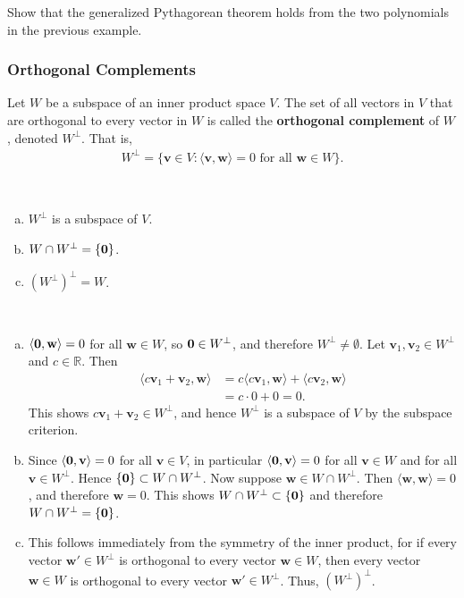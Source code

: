 \documentclass[12pt,letterpaper,reqno]{article}
\numberwithin{equation}{section}
\newcommand{\bv}{\mathbf{v}}
\newcommand{\bw}{\mathbf{w}}
\begin{document}
\begin{exercise}
	Show that the generalized Pythagorean theorem holds from the two polynomials in the previous example.
\end{exercise}

\subsubsection{Orthogonal Complements}
\begin{defn}
Let $W$ be a subspace of an inner product space $V$. The set of all vectors in $V$ that are orthogonal to every vector in $W$ is called the {\bf orthogonal complement} of $W$, denoted $W^\perp$. That is,
\begin{align*}
	W^\perp = \{\bv \in V : \langle \bv,\bw \rangle = 0 \text{ for all } \bw \in W\}.
\end{align*}	
\end{defn}

\begin{thm}\label{thm:orthogonal_complement}\
	\begin{enumerate}[(a)]
		\item $W^\perp$ is a subspace of $V$.
		\item $W \cap W^\perp=\{{\bf 0}\}$.
		\item $(W^\perp)^\perp=W$.
	\end{enumerate}
\end{thm}

\begin{pf}
	\
	\begin{enumerate}[(a)]
		\item $\langle {\bf 0},\bw \rangle = 0$ for all $\bw \in W$, so ${\bf 0} \in W^\perp$, and therefore $W^\perp \neq \emptyset$. Let $\bv_1,\bv_2 \in W^\perp$ and $c \in \mathbb{R}$. Then
		\begin{align*}
			\langle c\bv_1+\bv_2,\bw \rangle &=c\langle c\bv_1,\bw \rangle+\langle c\bv_2,\bw \rangle \\
			&=c \cdot 0 + 0 = 0.
		\end{align*}
		This shows $c\bv_1+\bv_2 \in W^\perp$, and hence $W^\perp$ is a subspace of $V$ by the subspace criterion.
		\item Since $\langle {\bf 0}, \bv \rangle=0$ for all $\bv \in V$, in particular $\langle {\bf 0}, \bv \rangle=0$ for all $\bv \in W$ and for all $\bv \in W^\perp$. Hence $\{{\bf 0}\} \subset W \cap W^\perp$. Now suppose $\bw \in W \cap W^\perp$. Then $\langle \bw,\bw \rangle = 0$, and therefore $\bw=0$. This shows $W \cap W^\perp \subset \{{\bf 0}\}$ and therefore $W \cap W^\perp = \{{\bf 0}\}$.
		\item This follows immediately from the symmetry of the inner product, for if every vector $\bw' \in W^\perp$ is orthogonal to every vector $\bw \in W$, then every vector $\bw \in W$ is orthogonal to every vector $\bw' \in W^\perp$. Thus, $(W^\perp)^\perp$.
	\end{enumerate}
\end{pf}
\end{document}

